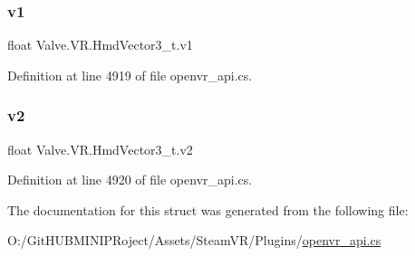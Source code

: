 \subsubsection{\texorpdfstring{v1}{v1}}
{\footnotesize\ttfamily float Valve.\+V\+R.\+Hmd\+Vector3\+\_\+t.\+v1}



Definition at line 4919 of file openvr\+\_\+api.\+cs.

\mbox{\label{struct_valve_1_1_v_r_1_1_hmd_vector3__t_aa98038d0aba070da444bc3a08afa99db}} 
\subsubsection{\texorpdfstring{v2}{v2}}
{\footnotesize\ttfamily float Valve.\+V\+R.\+Hmd\+Vector3\+\_\+t.\+v2}



Definition at line 4920 of file openvr\+\_\+api.\+cs.



The documentation for this struct was generated from the following file\+:\begin{DoxyCompactItemize}
\item 
O\+:/\+Git\+H\+U\+B\+M\+I\+N\+I\+P\+Roject/\+Assets/\+Steam\+V\+R/\+Plugins/\mbox{\hyperlink{openvr__api_8cs}{openvr\+\_\+api.\+cs}}\end{DoxyCompactItemize}
